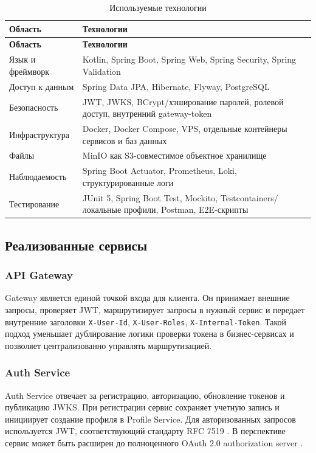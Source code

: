 \begin{longtable}{|p{4cm}|p{11cm}|}
\caption{Используемые технологии}\label{tab:stack}\\
\hline
\textbf{Область} & \textbf{Технологии} \\
\hline
\endfirsthead
\hline
\textbf{Область} & \textbf{Технологии} \\
\hline
\endhead
Язык и фреймворк & Kotlin, Spring Boot, Spring Web, Spring Security, Spring Validation \\
\hline
Доступ к данным & Spring Data JPA, Hibernate, Flyway, PostgreSQL \\
\hline
Безопасность & JWT, JWKS, BCrypt/хэширование паролей, ролевой доступ, внутренний gateway-token \\
\hline
Инфраструктура & Docker, Docker Compose, VPS, отдельные контейнеры сервисов и баз данных \\
\hline
Файлы & MinIO как S3-совместимое объектное хранилище \\
\hline
Наблюдаемость & Spring Boot Actuator, Prometheus, Loki, структурированные логи \cite{prometheus,loki} \\
\hline
Тестирование & JUnit 5, Spring Boot Test, Mockito, Testcontainers/локальные профили, Postman, E2E-скрипты \\
\hline
\end{longtable}

\subsection{Реализованные сервисы}

\subsubsection{API Gateway}

Gateway является единой точкой входа для клиента. Он принимает внешние запросы, проверяет JWT, маршрутизирует запросы в нужный сервис и передает внутренние заголовки \texttt{X-User-Id}, \texttt{X-User-Roles}, \texttt{X-Internal-Token}. Такой подход уменьшает дублирование логики проверки токена в бизнес-сервисах и позволяет централизованно управлять маршрутизацией.

\subsubsection{Auth Service}

Auth Service отвечает за регистрацию, авторизацию, обновление токенов и публикацию JWKS. При регистрации сервис сохраняет учетную запись и инициирует создание профиля в Profile Service. Для авторизованных запросов используется JWT, соответствующий стандарту RFC 7519 \cite{jwt}. В перспективе сервис может быть расширен до полноценного OAuth 2.0 authorization server \cite{oauth2}.

